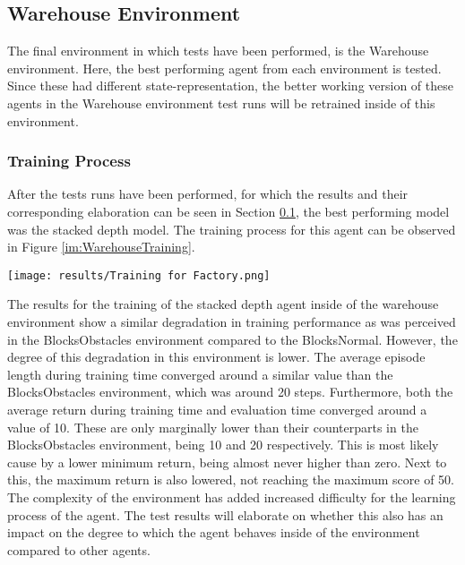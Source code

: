 \subsection{Warehouse Environment} \label{warehousetest}
The final environment in which tests have been performed, is the Warehouse environment. 
Here, the best performing agent from each environment is tested. Since these had 
different state-representation, the better working version of these agents in the Warehouse 
environment test runs will be retrained inside of this environment. 

\subsubsection{Training Process}
After the tests runs have been performed, for which the results and their corresponding 
elaboration can be seen in Section \ref{warehousetest}, the best performing model 
was the stacked depth model. The training process for this agent can be observed in 
Figure \ref{im:WarehouseTraining}.

\begin{Figure}
    \centering
    \texttt{[image: results/Training for Factory.png]}
    \label{im:WarehouseTraining}
\end{Figure}

The results for the training of the stacked depth agent inside of the warehouse environment 
show a similar degradation in training performance as was perceived in the BlocksObstacles 
environment compared to the BlocksNormal. However, the degree of this degradation in this 
environment is lower. The average episode length during training time converged around a 
similar value than the BlocksObstacles environment, which was around 20 steps. 
Furthermore, both the average return during training time and evaluation time converged around 
a value of 10. These are only marginally lower than their counterparts in the BlocksObstacles 
environment, being 10 and 20 respectively. This is most likely cause by a lower minimum return, 
being almost never higher than zero. Next to this, the maximum return is also lowered, 
not reaching the maximum score of 50. 
The complexity of the environment has added increased difficulty for the learning process 
of the agent. The test results will elaborate on whether this also has an impact on the 
degree to which the agent behaves inside of the environment compared to other agents. 


